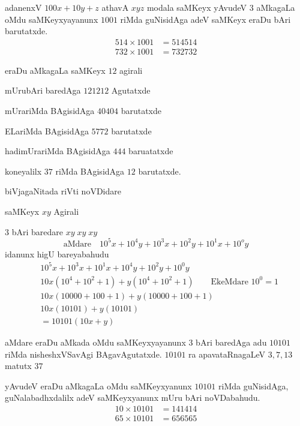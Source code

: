 adanenxV $100x+10y+z$ athavA $xyz$ modala saMKeyx yAvudeV $3$ aMkagaLa oMdu saMKeyxyayanunx $1001$ riMda guNisidAga adeV saMKeyx eraDu bAri barutatxde.
\begin{align*}
514\times 1001 &= 514514\\
732\times 1001 &= 732732
\end{align*}


eraDu aMkagaLa saMKeyx $12$ agirali

mUrubAri baredAga $121212$ Agutatxde

mUrariMda BAgisidAga $40404$ barutatxde

ELariMda BAgisidAga $5772$ barutatxde

hadimUrariMda BAgisidAga $444$ baruatatxde

koneyalilx $37$ riMda BAgisidAga $12$ barutatxde.

biVjagaNitada riVti noVDidare

saMKeyx $xy$ Agirali

$3$ bAri baredare $xy\;xy\;xy$
$$
\text{aMdare}\quad 10^{5}x+10^{4}y+10^{3}x+10^{2}y+10^{1}x+10^{o}y 
$$
idanunx higU bareyabahudu
\begin{align*}
&10^{5}x+10^{3}x+10^{1}x +10^{4}y+10^{2}y+10^{0}y\\
&10x\left(10^4 +10^2+1\right) +y\left(10^4+10^2+1\right)\qquad \text{EkeMdare $10^0 = 1$}\\
&10x(10000+100+1) + y (10000+100+1)\\
&10x(10101) + y(10101)\\
&=10101 (10x+y)
\end{align*}

aMdare eraDu aMkada oMdu saMKeyxyayanunx $3$ bAri baredAga adu $10101$ riMda nisheshxVSavAgi BAgavAgutatxde. $10101$ ra apavataRnagaLeV $3,7,13$ matutx $37$

yAvudeV eraDu aMkagaLa oMdu saMKeyxyanunx $10101$ riMda guNisidAga, guNa\-labadhxdalilx adeV saMKeyxyanunx mUru bAri noVDabahudu.
\begin{align*}
10\times 10101 &= 141414\\
65\times 10101 &= 656565
 \end{align*} 


